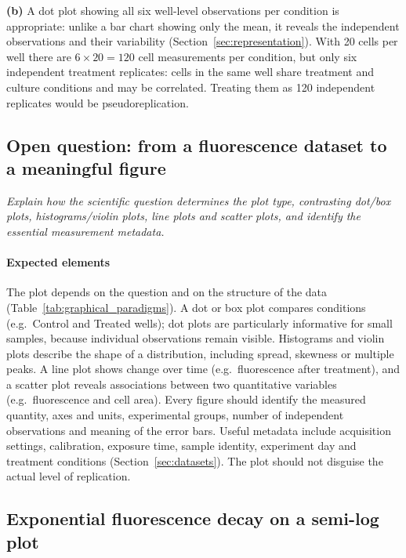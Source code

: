 \textbf{(b)} A dot plot showing all six well-level observations per condition is appropriate: unlike a bar chart showing only the mean, it reveals the independent observations and their variability (Section~\ref{sec:representation}). With 20 cells per well there are $6 \times 20 = 120$ cell measurements per condition, but only six independent treatment replicates: cells in the same well share treatment and culture conditions and may be correlated. Treating them as 120 independent replicates would be pseudoreplication.

\subsection{Open question: from a fluorescence dataset to a meaningful figure}

\emph{Explain how the scientific question determines the plot type, contrasting dot/box plots, histograms/violin plots, line plots and scatter plots, and identify the essential measurement metadata.}

\paragraph{Expected elements} The plot depends on the question and on the structure of the data (Table~\ref{tab:graphical_paradigms}). A dot or box plot compares conditions (e.g.\ Control and Treated wells); dot plots are particularly informative for small samples, because individual observations remain visible. Histograms and violin plots describe the shape of a distribution, including spread, skewness or multiple peaks. A line plot shows change over time (e.g.\ fluorescence after treatment), and a scatter plot reveals associations between two quantitative variables (e.g.\ fluorescence and cell area). Every figure should identify the measured quantity, axes and units, experimental groups, number of independent observations and meaning of the error bars. Useful metadata include acquisition settings, calibration, exposure time, sample identity, experiment day and treatment conditions (Section~\ref{sec:datasets}). The plot should not disguise the actual level of replication.

\subsection{Exponential fluorescence decay on a semi-log plot}
\label{ex:photobleaching}

